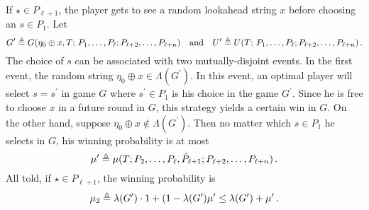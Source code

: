     If $\star \in P_{\ell + 1}$, 
    the player gets to see a random lookahead string $x$ 
    before choosing an $s \in P_1$. 
    Let
    \[
        G^\prime \triangleq G(\eta_0 \oplus x, T;\,P_{1}, \ldots, P_{\ell}; P_{\ell+{2}}, \ldots, P_{\ell + n})
        \quad\text{and}\quad
        U^\prime \triangleq U(T;\,P_{1}, \ldots, P_{\ell}; P_{\ell+{2}}, \ldots, P_{\ell + n})
        \,.
    \]
    The choice of $s$ 
    can be associated with two mutually-disjoint events. 
    In the first event, 
    the random string $\eta_0 \oplus x \in \Lambda(G^\prime)$. 
    In this event, 
    an optimal player will select $s = s^\prime$ in game $G$ 
    where $s^\prime \in P_1$ is his choice in the game $G^\prime$. 
    Since he is free to choose $x$ in a future round in $G$, 
    this strategy yields a certain win in $G$.
    On the other hand, 
    suppose $\eta_0 \oplus x \not \in \Lambda(G^\prime)$. 
    Then no matter which $s \in P_1$ he selects in $G$, 
    his winning probability is at most 
    \[
        \mu^\prime \triangleq \mu(T; P_{2}, \ldots, P_{\ell}, \hat{P}_{\ell + 1}; P_{\ell+{2}}, \ldots, P_{\ell + n})
        \,. 
    \]
    All told, if $\star \in P_{\ell + 1}$, 
    the winning probability is 
    \[
        \mu_2 \triangleq \lambda(G^\prime)\cdot 1 + (1 - \lambda(G^\prime) \mu^\prime 
        \leq \lambda(G^\prime) + \mu^\prime
        \,.
    \] 
    
